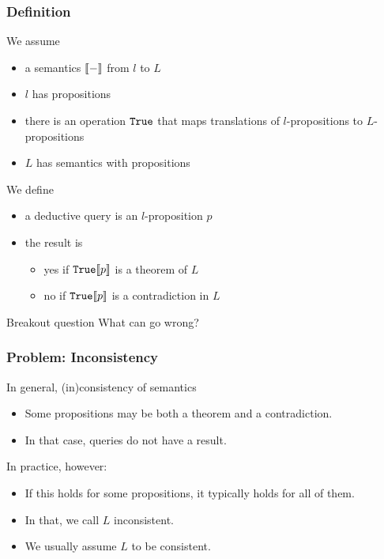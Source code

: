 \begin{frame}\frametitle{Definition}
We assume
\begin{itemize}
\item a semantics $\llbracket -\rrbracket$ from $l$ to $L$
\item $l$ has propositions
\item there is an operation $\mathtt{True}$ that maps translations of $l$-propositions to $L$-propositions
\item $L$ has semantics with propositions
\end{itemize}

We define
\begin{itemize}
\item a deductive query is an $l$-proposition $p$
\item the result is
 \begin{itemize}
 \item yes if $\mathtt{True} \llbracket p\rrbracket$ is a theorem of $L$
 \item no if $\mathtt{True} \llbracket p\rrbracket$ is a contradiction in $L$
 \end{itemize}
\end{itemize}
\end{frame}

\begin{frame}{Breakout question}
What can go wrong?
\end{frame}

\begin{frame}\frametitle{Problem: Inconsistency}
In general, (in)consistency of semantics
\begin{itemize}
\item Some propositions may be both a theorem and a contradiction.
\item In that case, queries do not have a result.
\end{itemize}

In practice, however:
\begin{itemize}
\item If this holds for some propositions, it typically holds for all of them.
\item In that, we call $L$ inconsistent.
\item We usually assume $L$ to be consistent.
\end{itemize}
\end{frame}


